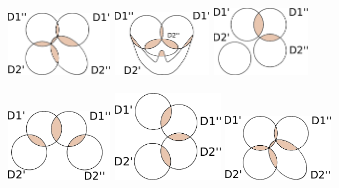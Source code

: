 \documentclass[11pt]{article}
\begin{document}
\begin{figure}[!htb]
%
    \centering
  \includegraphics[width=2.7cm]{CaseDifferentiation/CaseDifferentiation_2SameDim_Cross_1DimSomeDePairPartnered_Cross_1DimSomeDePairPartnered_2DiffDSDimShareSameDe_1SameDSShareSameDe.pdf}
  \label{}
\endminipage
{}%
    \centering
  \includegraphics[width=2.5cm]{CaseDifferentiation/CaseDifferentiation_2SameDim_Cross_1DimSomeDePairPartnered_Cross_1DimSomeDePairPartnered_2DiffDSDimShareSameDe_2SameDSShareSameDe.pdf}
  \label{}
\endminipage
{}
    \centering
    \includegraphics[width=2.5cm]{CaseDifferentiation/CaseDifferentiation_2SameDim_3DimSomeDePairPartnered_3Chaining.pdf}
  \label{}
\endminipage\hfill
\end{figure}

\begin{figure}[!htb]
%
    \centering
  \includegraphics[width=2.7cm]{CaseDifferentiation/CaseDifferentiation_2SameDim_4DimSomeDePairPartnered_4Chaining.pdf}
  \label{}
\endminipage
{}%
    \centering
  \includegraphics[width=2.8cm]{CaseDifferentiation/CaseDifferentiation_2SameDim_4DimSomeDePairPartnered_4Chaining2.pdf}
  \label{}
\endminipage
{}%
    \centering
  \includegraphics[width=2.8cm]{CaseDifferentiation/CaseDifferentiation_2SameDim_Cross_1DimSomeDePairPartnered_Circle.pdf}
  \label{}
\endminipage
\end{figure}
\end{document}
